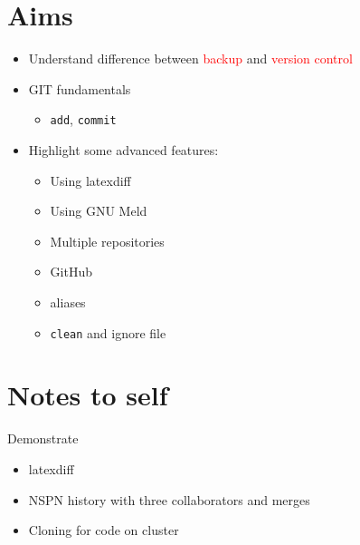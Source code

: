 \documentclass[a4paper,12pt]{article}
\newcommand{\ALERT}[1]{\textcolor{red}{#1}}
\newcommand{\CMD}[1]{\texttt{#1}}
\begin{document}
\section{Aims}
\label{sec:aims}

\begin{itemize}
\item Understand difference between \ALERT{backup} and \ALERT{version
    control}
\item GIT fundamentals
  \begin{itemize}
  \item \CMD{add}, \CMD{commit}
  \end{itemize}
\item Highlight some advanced features:
  \begin{itemize}
  \item Using latexdiff
  \item Using GNU Meld
  \item Multiple repositories
  \item GitHub
  \item aliases
  \item \CMD{clean} and ignore file
  \end{itemize}
\end{itemize}

\section{Notes to self}
\label{sec:notes-self}

Demonstrate
\begin{itemize}
\item latexdiff
\item NSPN history with three collaborators and merges
\item Cloning for code on cluster
\end{itemize}
\end{document}
